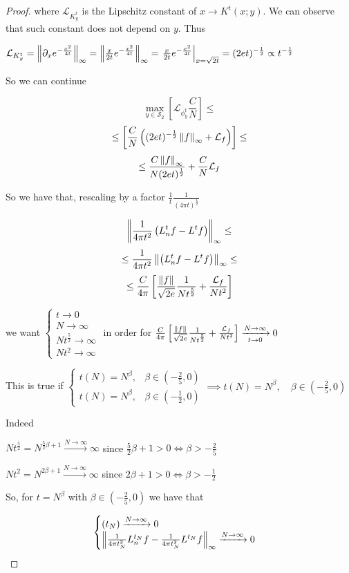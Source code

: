 \begin{proof}
	where $\mathcal L_{K^t_y}$ is the Lipschitz constant of $x\rightarrow K^t(x;y)$. We can observe that such constant does not depend on $y$. Thus
	
	$\mathcal L_{K^t_y} = \left\lVert\partial_x e^{-\frac{x^2}{4t}}\right\rVert_\infty = \left\lVert\frac{x}{2t}e^{-\frac{x^2}{4t}}\right\rVert_\infty = \left. \frac{x}{2t}e^{-\frac{x^2}{4t}}\right|_{x=\sqrt{2t}}=(2et)^{-\frac{1}{2}}\propto t ^ {-\frac{1}{2}}$
	
	So we can continue
	
	$$ \max _{y\in \mathcal S_2} \left[  \mathcal L_{\phi^t_y} \frac{C}{N} \right]\leq$$
	$$ \leq \left[   \frac{C}{N} \left( (2et)^{-\frac{1}{2}} \left\lVert f\right\rVert_\infty + \mathcal L_f \right)\right]\leq$$
	$$  \leq \frac{C\left\lVert f\right\rVert_\infty}{N(2et)^\frac{1}{2}} +   \frac{C}{N}\mathcal L_f$$
	
	So we have that, rescaling by a factor $\frac{1}{t}\frac{1}{(4\pi t)^{\frac{k}{2}}}$
	
	$$\left\lVert\frac{1}{4\pi t^2}\left(L_n^tf-L^tf\right)\right\rVert_\infty\leq$$
	$$\leq \frac{1}{4\pi t^2}\left\lVert\left(L_n^tf-L^tf\right)\right\rVert_\infty \leq$$
	$$ \leq \frac{C}{4\pi}\left[\frac{\left\lVert f\right\rVert}{\sqrt{2e}}\frac{1}{Nt^\frac{5}{2}} + \frac{\mathcal L_f}{Nt^2}\right]$$
	
	we want $\begin{cases}
	t \rightarrow 0\\
	N \rightarrow \infty\\
	Nt^\frac{5}{2} \rightarrow \infty\\
	Nt^2 \rightarrow \infty
	\end{cases}$ in order for $ \frac{C}{4\pi}\left[\frac{\left\lVert f\right\rVert}{\sqrt{2e}}\frac{1}{Nt^\frac{5}{2}} + \frac{\mathcal L_f}{Nt^2}\right] \xrightarrow[t\to 0 ]{N\to\infty}0$
	
	This is true if $\begin{cases}
	t(N) = N^\beta, &\beta\in(-\frac{2}{5}, 0) \\
	t(N) = N^\beta, &\beta\in(-\frac{1}{2}, 0)
	\end{cases} \implies t(N) = N^\beta, \quad \beta\in(-\frac{2}{5}, 0)$
	
	Indeed 
	
	$Nt^\frac{5}{2}=N^{\frac{5}{2}\beta+1}\xrightarrow{N \to \infty} \infty$ since $\frac{5}{2}\beta+1>0 \iff \beta>-\frac{2}{5}$
	
	$Nt^2=N^{2\beta+1}\xrightarrow {N \to \infty} \infty$ since $2\beta+1>0 \iff \beta>-\frac{1}{2}$
	
	So, for $t=N^\beta$ with $\beta\in(-\frac{2}{5}, 0)$ we have that 
	
	$$\begin{cases}
	(t_N)\xrightarrow{N\to\infty}0\\
	\left\lVert\frac{1}{4\pi t_N^2}L_n^{t_N}f-\frac{1}{4\pi t_N^2}L^{t_N}f\right\rVert_\infty  \xrightarrow{N\to\infty}0
	\end{cases}$$
	
\end{proof}

